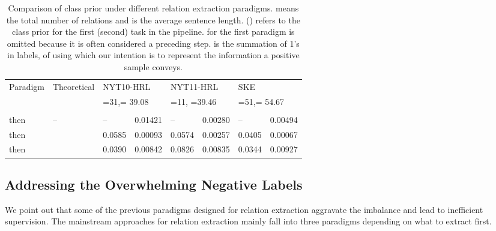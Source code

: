 \documentclass[11pt,a4paper]{article}
\begin{document}
\begin{table*}[!htbp]
    \centering
    \small
      \begin{tabular}{lllrrrrrr}
          \toprule
          \multicolumn{1}{r}{\multirow{3}[6]{*}{Paradigm}} & \multicolumn{2}{c}{\multirow{2}[4]{*}{Theoretical}} & \multicolumn{2}{l}{NYT10-HRL} & \multicolumn{2}{l}{NYT11-HRL} & \multicolumn{2}{l}{SKE} \\
          \cmidrule{4-9}             & \multicolumn{2}{r}{} & \multicolumn{2}{l}{=31,= 39.08} & \multicolumn{2}{l}{=11, =39.46} & \multicolumn{2}{l}{=51,= 54.67} \\
          \cmidrule{2-9}             &   &   & \multicolumn{1}{l}{} & \multicolumn{1}{l}{} & \multicolumn{1}{l}{} & \multicolumn{1}{l}{} & \multicolumn{1}{l}{} & \multicolumn{1}{l}{} \\
          \midrule
            then  & --       &  & \multicolumn{1}{l}{--} & 0.01421  & \multicolumn{1}{l}{--} & 0.00280  & \multicolumn{1}{l}{--} & 0.00494 \\
            then  &  &  & 0.0585   & 0.00093  & 0.0574   & 0.00257  & 0.0405   & 0.00067 \\
           then  &  &  & 0.0390   & 0.00842  & 0.0826   & 0.00835  & 0.0344   & 0.00927 \\
          \bottomrule
      \end{tabular}\caption{Comparison of class prior under different relation extraction paradigms.  means the total number of relations and  is the average sentence length.  () refers to the class prior for the first (second) task in the pipeline.  for the first paradigm is omitted because it is often considered a preceding step.  is the summation of 1's in labels, of using which our intention is to represent the information a positive sample conveys.}
    \label{tab:neglabel}\end{table*}

\subsection{Addressing the Overwhelming Negative Labels}
\label{sec:neglabel}

We point out that some of the previous paradigms designed for relation extraction aggravate the imbalance and lead to inefficient supervision.
The mainstream approaches for relation extraction mainly fall into three paradigms depending on what to extract first.
\end{document}
